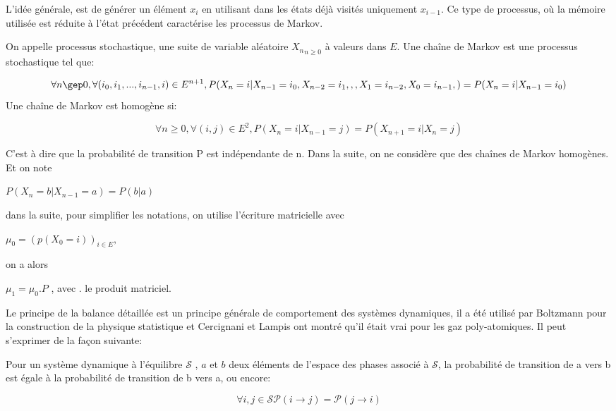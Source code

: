 L'idée générale, est de générer un élément $x_i$ en utilisant dans les états déjà visités uniquement $x_{i-1}$. Ce type de processus, où la mémoire utilisée est réduite à l'état précédent caractérise les processus de Markov.


On appelle processus stochastique, une suite de variable aléatoire ${X_n}_{n\geq 0}$ à valeurs dans $E$.
Une chaîne de Markov est une processus stochastique tel que:

\begin{equation}
  \forall n \gep 0 , \forall (i_0,i_1,...,i_{n-1},i) \in E^{n+1},
  
  P(X_n=i|X_{n-1}=i_0,X_{n-2}=i_1,,,X_{1}=i_{n-2},X_{0}=i_{n-1},) = P(X_n=i|X_{n-1}=i_0) 
\end{equation}
Une chaîne de Markov est homogène si:

\begin{equation}
  \label{eq_homog}
  \forall n \geq 0 , \forall (i,j) \in E^2,
  
  P(X_n=i|X_{n-1}=j)= P(X_{n+1}=i|X_n=j) 
\end{equation}

C'est à dire que la probabilité de transition P est indépendante de n. Dans la suite, on ne considère que des chaînes de Markov homogènes. Et on note

$P(X_n=b | X_{n-1}=a) = P(b|a)$


dans la suite, pour simplifier les notations, on utilise l'écriture matricielle avec

$\mu_0 =(p(X_0=i))_{i \in E},$

on a alors

$\mu_1 =\mu_0 . P$   , avec . le produit matriciel.


Le principe de la balance détaillée est un principe générale de comportement des systèmes dynamiques, il a été utilisé par Boltzmann pour la construction de la physique statistique et Cercignani et Lampis ont montré qu'il était vrai pour les gaz poly-atomiques. Il peut s'exprimer de la façon suivante:

Pour un système dynamique à l'équilibre $\mathcal{S}$ , $a$ et $b$ deux éléments de l'espace des phases associé à $\mathcal{S}$, la probabilité de transition de a vers b est égale à la probabilité de transition de b vers a, ou encore: 

\begin{equation}
  \forall i,j \in \mathcal{S}
  
\mathcal{P}(i \rightarrow j) = \mathcal{P}(j \rightarrow i) 
\end{equation}

